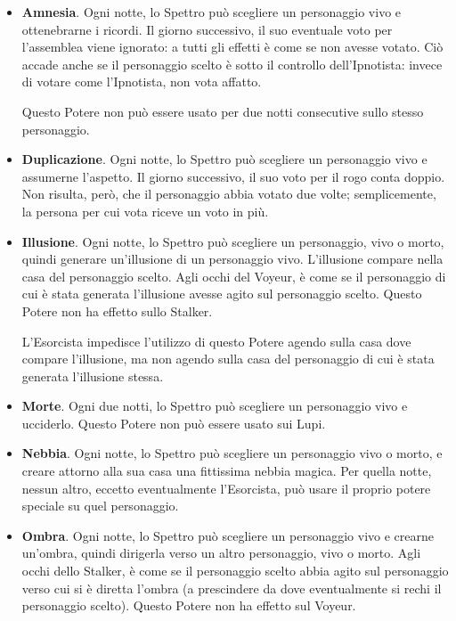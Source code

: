 \documentclass[a4paper,10pt]{article}
\begin{document}
\begin{itemize}
 \item {\bf Amnesia}. Ogni notte, lo Spettro può scegliere un personaggio vivo e ottenebrarne i ricordi. Il giorno successivo, il suo eventuale voto per l'assemblea viene ignorato: a tutti gli effetti è come se non avesse votato. Ciò accade anche se il personaggio scelto è sotto il controllo dell'Ipnotista: invece di votare come l'Ipnotista, non vota affatto.
 
 Questo Potere non può essere usato per due notti consecutive sullo stesso personaggio.

 \item {\bf Duplicazione}. Ogni notte, lo Spettro può scegliere un personaggio vivo e assumerne l'aspetto. Il giorno successivo, il suo voto per il rogo conta doppio. Non risulta, però, che il personaggio abbia votato due volte; semplicemente, la persona per cui vota riceve un voto in più.

 \item {\bf Illusione}. Ogni notte, lo Spettro può scegliere un personaggio, vivo o morto, quindi generare un'illusione di un personaggio vivo. L'illusione compare nella casa del personaggio scelto.
 Agli occhi del Voyeur, è come se il personaggio di cui è stata generata l'illusione avesse agito sul personaggio scelto.
 Questo Potere non ha effetto sullo Stalker.
 
 L'Esorcista impedisce l'utilizzo di questo Potere agendo sulla casa dove compare l'illusione, ma non agendo sulla casa del personaggio di cui è stata generata l'illusione stessa.

 \item {\bf Morte}. Ogni due notti, lo Spettro può scegliere un personaggio vivo e ucciderlo. Questo Potere non può essere usato sui Lupi.
 
 \item {\bf Nebbia}. Ogni notte, lo Spettro può scegliere un personaggio vivo o morto, e creare attorno alla sua casa una fittissima nebbia magica. Per quella notte, nessun altro, eccetto eventualmente l'Esorcista, può usare il proprio potere speciale su quel personaggio.
 
 \item {\bf Ombra}. Ogni notte, lo Spettro può scegliere un personaggio vivo e crearne un'ombra, quindi dirigerla verso un altro personaggio, vivo o morto.
 Agli occhi dello Stalker, è come se il personaggio scelto abbia agito sul personaggio verso cui si è diretta l'ombra (a prescindere da dove eventualmente si rechi il personaggio scelto).
 Questo Potere non ha effetto sul Voyeur.
 

\end{itemize}
\end{document}
